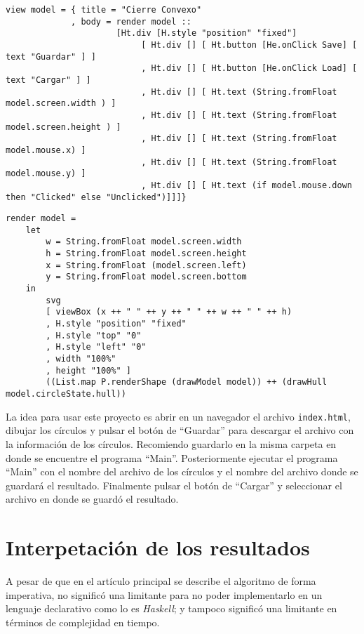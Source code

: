 \documentclass[12pt]{article}
\begin{document}
\begin{itemize}
  \begin{verbatim}
view model = { title = "Cierre Convexo"
             , body = render model ::
                      [Ht.div [H.style "position" "fixed"]
                           [ Ht.div [] [ Ht.button [He.onClick Save] [ text "Guardar" ] ]
                           , Ht.div [] [ Ht.button [He.onClick Load] [ text "Cargar" ] ]
                           , Ht.div [] [ Ht.text (String.fromFloat model.screen.width ) ]
                           , Ht.div [] [ Ht.text (String.fromFloat model.screen.height ) ]
                           , Ht.div [] [ Ht.text (String.fromFloat model.mouse.x) ]
                           , Ht.div [] [ Ht.text (String.fromFloat model.mouse.y) ]
                           , Ht.div [] [ Ht.text (if model.mouse.down then "Clicked" else "Unclicked")]]]}
  \end{verbatim}

  \begin{verbatim}
render model =
    let
        w = String.fromFloat model.screen.width
        h = String.fromFloat model.screen.height
        x = String.fromFloat (model.screen.left)
        y = String.fromFloat model.screen.bottom
    in
        svg
        [ viewBox (x ++ " " ++ y ++ " " ++ w ++ " " ++ h)
        , H.style "position" "fixed"
        , H.style "top" "0"
        , H.style "left" "0"
        , width "100%"
        , height "100%" ]
        ((List.map P.renderShape (drawModel model)) ++ (drawHull model.circleState.hull))
  \end{verbatim}
  
\end{itemize}

La idea para usar este proyecto es abrir en un navegador el archivo \texttt{index.html}, dibujar los círculos y pulsar el botón de ``Guardar'' para descargar el archivo con la información de los círculos. Recomiendo guardarlo en la misma carpeta en donde se encuentre el programa ``Main''. Posteriormente ejecutar el programa ``Main'' con el nombre del archivo de los círculos y el nombre del archivo donde se guardará el resultado. Finalmente pulsar el botón de ``Cargar'' y seleccionar el archivo en donde se guardó el resultado.

\section*{Interpetación de los resultados}

\noindent A pesar de que en el artículo principal se describe el algoritmo de forma imperativa, no significó una limitante para no poder implementarlo en un lenguaje declarativo como lo es \textit{Haskell}; y tampoco significó una limitante en términos de complejidad en tiempo.
\end{document}
